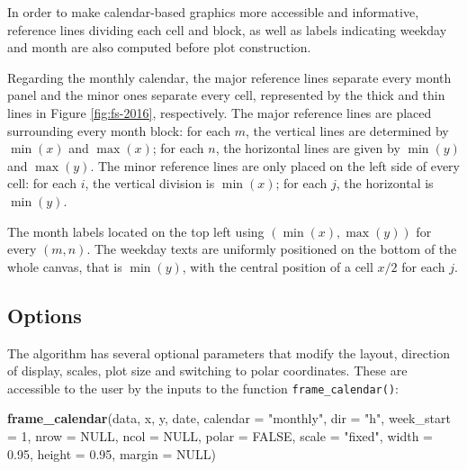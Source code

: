 \documentclass[12pt]{article}
\newenvironment{Shaded}{\begin{snugshade}}{\end{snugshade}}
\newcommand{\DataTypeTok}[1]{\textcolor[rgb]{0.13,0.29,0.53}{#1}}
\newcommand{\DecValTok}[1]{\textcolor[rgb]{0.00,0.00,0.81}{#1}}
\newcommand{\FloatTok}[1]{\textcolor[rgb]{0.00,0.00,0.81}{#1}}
\newcommand{\KeywordTok}[1]{\textcolor[rgb]{0.13,0.29,0.53}{\textbf{#1}}}
\newcommand{\NormalTok}[1]{#1}
\newcommand{\OtherTok}[1]{\textcolor[rgb]{0.56,0.35,0.01}{#1}}
\newcommand{\StringTok}[1]{\textcolor[rgb]{0.31,0.60,0.02}{#1}}
\begin{document}
In order to make calendar-based graphics more accessible and informative, reference lines dividing each cell and block, as well as labels indicating weekday and month are also computed before plot construction.

Regarding the monthly calendar, the major reference lines separate every month panel and the minor ones separate every cell, represented by the thick and thin lines in Figure \ref{fig:fs-2016}, respectively. The major reference lines are placed surrounding every month block: for each \(m\), the vertical lines are determined by \(\min{(x)}\) and \(\max{(x)}\); for each \(n\), the horizontal lines are given by \(\min{(y)}\) and \(\max{(y)}\). The minor reference lines are only placed on the left side of every cell: for each \(i\), the vertical division is \(\min{(x)}\); for each \(j\), the horizontal is \(\min{(y)}\).

The month labels located on the top left using \((\min{(x)}, \max{(y)})\) for every \((m, n)\). The weekday texts are uniformly positioned on the bottom of the whole canvas, that is \(\min{(y)}\), with the central position of a cell \(x / 2\) for each \(j\).

\hypertarget{sec:opt}{%
\subsection{Options}\label{sec:opt}}

The algorithm has several optional parameters that modify the layout, direction of display, scales, plot size and switching to polar coordinates. These are accessible to the user by the inputs to the function \texttt{frame\_calendar()}:

\begin{Shaded}
\begin{Highlighting}[]
\KeywordTok{frame_calendar}\NormalTok{(data, x, y, date, }\DataTypeTok{calendar =} \StringTok{"monthly"}\NormalTok{, }\DataTypeTok{dir =} \StringTok{"h"}\NormalTok{,}
  \DataTypeTok{week_start =} \DecValTok{1}\NormalTok{, }\DataTypeTok{nrow =} \OtherTok{NULL}\NormalTok{, }\DataTypeTok{ncol =} \OtherTok{NULL}\NormalTok{, }\DataTypeTok{polar =} \OtherTok{FALSE}\NormalTok{, }\DataTypeTok{scale =} \StringTok{"fixed"}\NormalTok{,}
  \DataTypeTok{width =} \FloatTok{0.95}\NormalTok{, }\DataTypeTok{height =} \FloatTok{0.95}\NormalTok{, }\DataTypeTok{margin =} \OtherTok{NULL}\NormalTok{)}
\end{Highlighting}
\end{Shaded}
\end{document}
